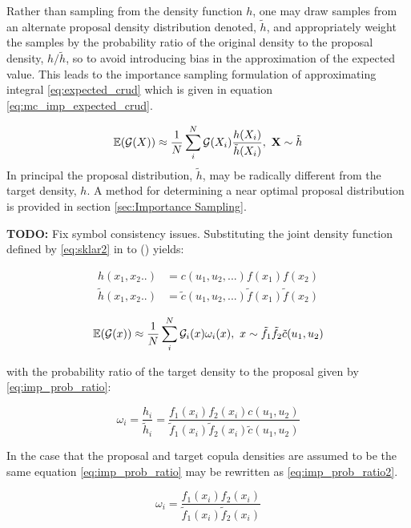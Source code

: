 Rather than sampling from the density function $h$, one may draw samples from an alternate proposal density distribution denoted, $\tilde h$, and appropriately weight the samples by the probability ratio of the original density to the proposal density, $h/\tilde h$, so to avoid introducing bias in the approximation of the expected value.  This leads to the importance sampling formulation of approximating integral \ref{eq:expected_crud}  which is given in equation \ref{eq:mc_imp_expected_crud}.

\begin{equation}
\operatorname*{\mathbb{E}}(\mathcal G(X)) \approx \frac{1}{N} \sum_i^N \mathcal G(X_i) \frac{h(X_i)}{\tilde h(X_i)}, \ \mathbf{X} \sim \tilde{h}
\label{eq:mc_imp_expected_crud}
\end{equation}
In principal the proposal distribution, $\tilde h$, may be radically different from the target density, $h$.  A method for determining a near optimal proposal distribution is provided in section \ref{sec:Importance Sampling}.

\textbf{TODO:} Fix symbol consistency issues.
Substituting the joint density function defined by \ref{eq:sklar2} in to () yields:

\begin{align}
    h(x_1, x_2..) &= c(u_1, u_2, ...) f(x_1) f(x_2) \nonumber \\
    \tilde h(x_1, x_2..) &= \tilde c(u_1, u_2, ...) \tilde f(x_1) \tilde f(x_2)
\label{eq:mc_imp_int_2}
\end{align}

\begin{equation}
\operatorname*{\mathbb{E}}(\mathcal G(x)) \approx \frac{1}{N} \sum_i^N \mathcal G_i(x) \omega_i(x), \ x \sim \tilde{f_1} \tilde f_2 \tilde c(u_1, u_2)
\label{eq:mc_imp_int2}
\end{equation}

with the probability ratio of the target density to the proposal given by \ref{eq:imp_prob_ratio}:

\begin{equation}
\omega_i = \frac{h_i}{\tilde h_i} = \frac{f_1(x_i) f_2(x_i)c(u_1, u_2)}{\tilde f_1(x_i) \tilde f_2(x_i) \tilde c(u_1, u_2)}
\label{eq:imp_prob_ratio}
\end{equation}

In the case that the proposal and target copula densities are assumed to be the same equation \ref{eq:imp_prob_ratio} may be rewritten as \ref{eq:imp_prob_ratio2}.

\begin{equation}
\omega_i = \frac{f_1(x_i) f_2(x_i)}{\tilde f_1(x_i) \tilde f_2(x_i)}
\label{eq:imp_prob_ratio2}
\end{equation}


